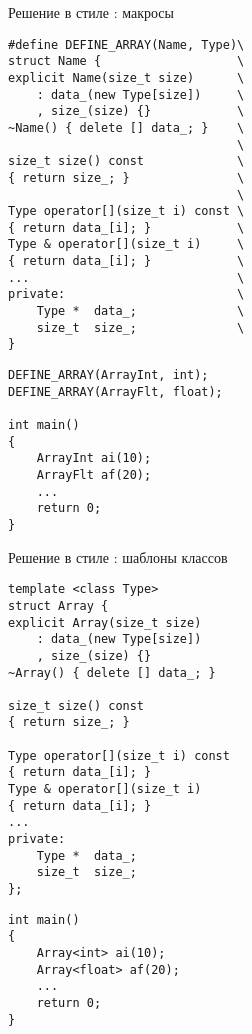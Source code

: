 \documentclass{beamer}
\begin{document}
\begin{frame}[fragile]{Решение в стиле \langc: макросы}
\small
\begin{minipage}{.5\textwidth}
    \begin{lstlisting}
#define DEFINE_ARRAY(Name, Type)\
struct Name {                   \
explicit Name(size_t size)      \
    : data_(new Type[size])     \
    , size_(size) {}            \
~Name() { delete [] data_; }    \
                                \
size_t size() const             \
{ return size_; }               \
                                \
Type operator[](size_t i) const \
{ return data_[i]; }            \
Type & operator[](size_t i)     \ 
{ return data_[i]; }            \
...                             \
private:                        \
    Type *  data_;              \
    size_t  size_;              \
}
    \end{lstlisting}
\end{minipage}\hspace{.03\textwidth}%
\begin{minipage}{.45\textwidth}
    \begin{lstlisting}
DEFINE_ARRAY(ArrayInt, int);
DEFINE_ARRAY(ArrayFlt, float);

int main()
{
    ArrayInt ai(10);
    ArrayFlt af(20);
    ...
    return 0;
}
    \end{lstlisting}
\end{minipage}
\end{frame}

\begin{frame}[fragile]{Решение в стиле \langcpp: шаблоны классов}
\small
\begin{minipage}{.5\textwidth}
    \begin{lstlisting}
template <class Type>
struct Array {                               
explicit Array(size_t size)      
    : data_(new Type[size])     
    , size_(size) {}                              
~Array() { delete [] data_; }            
                                
size_t size() const             
{ return size_; }               
                                
Type operator[](size_t i) const 
{ return data_[i]; }            
Type & operator[](size_t i)      
{ return data_[i]; }            
...                             
private:                        
    Type *  data_;              
    size_t  size_;              
};
    \end{lstlisting}
\end{minipage}\hspace{.03\textwidth}%
\begin{minipage}{.45\textwidth}
    \begin{lstlisting}
int main()
{
    Array<int> ai(10);
    Array<float> af(20);
    ...       
    return 0;
}
    \end{lstlisting}
\end{minipage}
\end{frame}
\end{document}
